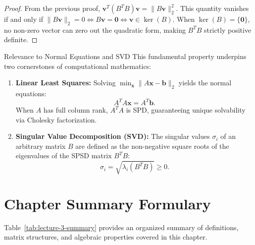 \begin{proof}
From the previous proof, $\mathbf{v}^T (B^T B) \mathbf{v} = \|B\mathbf{v}\|_2^2$. This quantity vanishes if and only if $\|B\mathbf{v}\|_2 = 0 \iff B\mathbf{v} = \mathbf{0} \iff \mathbf{v} \in \ker(B)$.
When $\ker(B) = \{\mathbf{0}\}$, no non-zero vector can zero out the quadratic form, making $B^T B$ strictly positive definite.
\end{proof}

\begin{noteblock}{Relevance to Normal Equations and SVD}
This fundamental property underpins two cornerstones of computational mathematics:
\begin{enumerate}
    \item \textbf{Linear Least Squares:} Solving $\min_{\mathbf{x}} \|A\mathbf{x} - \mathbf{b}\|_2$ yields the normal equations:
    \begin{equation}
        A^T A \mathbf{x} = A^T \mathbf{b}.
    \end{equation}
    When $A$ has full column rank, $A^T A$ is SPD, guaranteeing unique solvability via Cholesky factorization.
    \item \textbf{Singular Value Decomposition (SVD):} The singular values $\sigma_i$ of an arbitrary matrix $B$ are defined as the non-negative square roots of the eigenvalues of the SPSD matrix $B^T B$:
    \begin{equation}
        \sigma_i = \sqrt{\lambda_i(B^T B)} \ge 0.
    \end{equation}
\end{enumerate}
\end{noteblock}

\clearpage
\section{Chapter Summary Formulary}

Table~\ref{tab:lecture-3-summary} provides an organized summary of definitions, matrix structures, and algebraic properties covered in this chapter.

